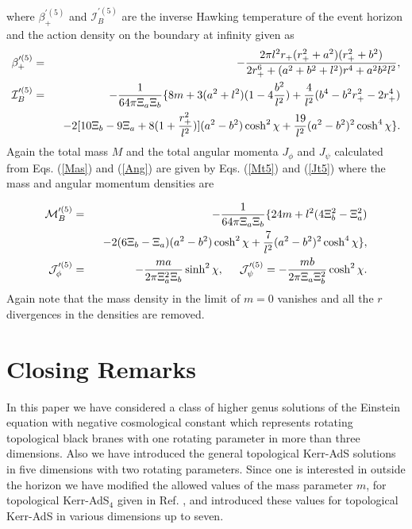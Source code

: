 \documentclass[a4paper,12pt,onecolumn]{revtex4}
\begin{document}
where $\beta _{+}^{\prime (5)}$ and $\mathcal{I}_B^{\prime (5)}$
are the inverse Hawking temperature of the event horizon and the
action density on the boundary at infinity given as
\begin{eqnarray*}
\beta _{+}^{\prime (5)} &=&-\frac{2\pi l^2r_{+}(r_{+}^2+a^2)(r_{+}^2+b^2)}{%
2r_{+}^6+(a^2+b^2+l^2)r^4+a^2b^2l^2},  \label{A25b} \\
\mathcal{I}_B^{\prime (5)} &=&-\frac 1{64\pi \Xi _a\Xi _b}\{8m+3(a^2+l^2)(1-4%
\frac{b^2}{l^2})+\frac 4{l^2}(b^4-b^2r_{+}^2-2r_{+}^4) \\
&&\ \ -2[10\Xi _b-9\Xi _a+8(1+\frac{r_{+}^2}{l^2})](a^2-b^2)\cosh ^2\chi +%
\frac{19}{l^2}(a^2-b^2)^2\cosh ^4\chi \}.
\end{eqnarray*}
Again the total mass $M$ and the total angular momenta $J_\phi $
and $J_\psi $ calculated from Eqs. (\ref{Mas}) and (\ref{Ang}) are
given by Eqs. (\ref{Mt5}) and (\ref{Jt5}) where the mass and
angular momentum densities are

\begin{eqnarray*}
\mathcal{M}_B^{\prime (5)} &=&-\frac 1{64\pi \Xi _a\Xi _b}\{24m+l^2(4\Xi
_b^2-\Xi _a^2) \\
&&\ \ -2(6\Xi _b-\Xi _a)(a^2-b^2)\cosh ^2\chi +\frac 7{l^2}(a^2-b^2)^2\cosh
^4\chi \},  \label{M5b} \\
\mathcal{J}_\phi ^{\prime (5)} &=&-\frac{ma}{2\pi \Xi _a^2\Xi
_b}\sinh ^2\chi ,\hspace{.5cm }\mathcal{J}_\psi ^{\prime
(5)}=-\frac{mb}{2\pi \Xi _a\Xi _b^2}\cosh ^2\chi .  \label{J5b}
\end{eqnarray*}
Again note that the mass density in the limit of $m=0$ vanishes and all the $%
r$ divergences in the densities are removed.

\section{Closing Remarks}

In this paper we have considered a class of higher genus solutions
of the Einstein equation with negative cosmological constant which
represents rotating topological black branes with one rotating
parameter in more than three dimensions. Also we have introduced
the general topological Kerr-AdS solutions in five dimensions with
two rotating parameters. Since one is interested in outside the
horizon we have modified the allowed values of the mass parameter
$m$, for topological Kerr-AdS$_4$ given in Ref. \cite{Kl97}, and
introduced these values for topological Kerr-AdS in various
dimensions up to seven.
\end{document}
